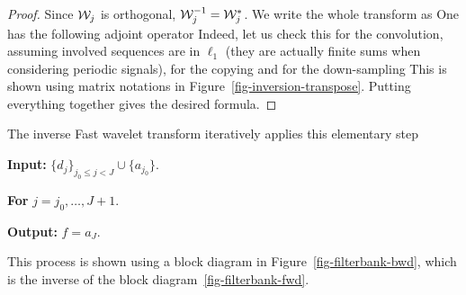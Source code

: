 \begin{proof}
Since $\mathcal{W}_j$ is orthogonal, $\mathcal{W}_j^{-1} = \mathcal{W}_j^*$.
%
We write the whole transform as 
One has the following adjoint operator
Indeed, let us check this for the convolution, assuming involved sequences are in $\ell_1$ (they are actually finite sums when considering periodic signals), 
for the copying
and for the down-sampling
This is shown using matrix notations in Figure~\ref{fig-inversion-transpose}.
%
Putting everything together gives the desired formula.
\end{proof}



The inverse Fast wavelet transform iteratively applies this elementary step
\begin{rs}
	\item \textbf{Input:} $\{ d_j \}_{j_0 \leq j < J} \cup \{ a_{j_0} \}$.
	\item \textbf{For} $j=j_0, \ldots, J+1$.
	\item \textbf{Output:} $f = a_J$.
\end{rs}
This process is shown using a block diagram in Figure~\ref{fig-filterbank-bwd}, which is the inverse of the block diagram~\ref{fig-filterbank-fwd}. 



